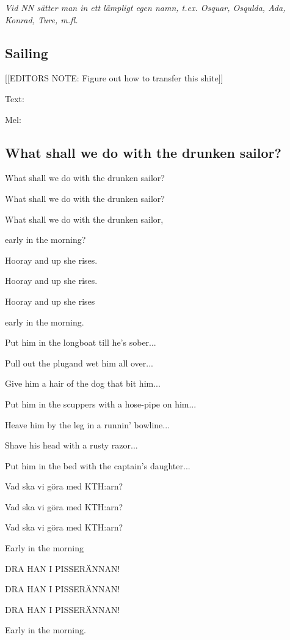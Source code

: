 \emph{Vid NN sätter man in ett lämpligt egen namn,
t.ex. Osquar, Osqulda, Ada, Konrad, Ture, m.fl. }

\subsection{\textbf{Sailing}}

[[EDITORS NOTE: Figure out how to transfer this shite]]

Text: 

Mel: \bigskip

\subsection{\textbf{What shall we do with the drunken sailor?}}

What shall we do with the drunken sailor?

What shall we do with the drunken sailor?

What shall we do with the drunken sailor,

early in the morning?\bigskip

Hooray and up she rises.

Hooray and up she rises.

Hooray and up she rises

early in the morning. \bigskip

Put him in the longboat till he's sober...\bigskip

Pull out the plugand wet him all over...\bigskip

Give him a hair of the dog that bit him...\bigskip

Put him in the scuppers with a hose-pipe on him...\bigskip

Heave him by the leg in a runnin' bowline...\bigskip

Shave his head with a rusty razor...\bigskip

Put him in the bed with the captain's daughter... \bigskip

Vad ska vi göra med KTH:arn?

Vad ska vi göra med KTH:arn?

Vad ska vi göra med KTH:arn?

Early in the morning \bigskip

DRA HAN I PISSERÄNNAN!

DRA HAN I PISSERÄNNAN!

DRA HAN I PISSERÄNNAN!

Early in the morning. \bigskip

